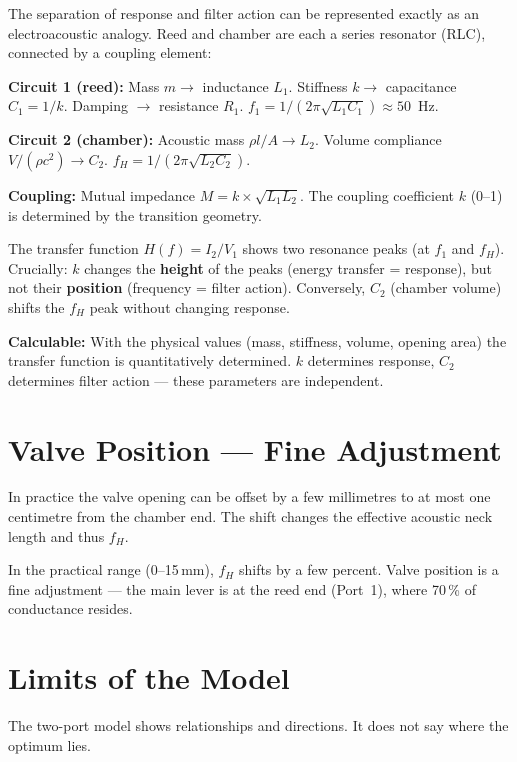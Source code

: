 \documentclass[11pt,a4paper]{article}
\begin{document}
The separation of response and filter action can be represented exactly as an electroacoustic analogy. Reed and chamber are each a series resonator (RLC), connected by a coupling element:

\textbf{Circuit 1 (reed):} Mass $m \to$ inductance $L_1$. Stiffness $k \to$ capacitance $C_1 = 1/k$. Damping $\to$ resistance $R_1$. $f_1 = 1/(2\pi\sqrt{L_1 C_1}) \approx 50$~Hz.

\textbf{Circuit 2 (chamber):} Acoustic mass $\rho l/A \to L_2$. Volume compliance $V/(\rho c^2) \to C_2$. $f_H = 1/(2\pi\sqrt{L_2 C_2})$.

\textbf{Coupling:} Mutual impedance $M = k \times \sqrt{L_1 L_2}$. The coupling coefficient $k$ (0--1) is determined by the transition geometry.

The transfer function $H(f) = I_2 / V_1$ shows two resonance peaks (at $f_1$ and $f_H$). Crucially: $k$ changes the \textbf{height} of the peaks (energy transfer = response), but not their \textbf{position} (frequency = filter action). Conversely, $C_2$ (chamber volume) shifts the $f_H$ peak without changing response.

\begin{tcolorbox}[colframe=keygreen, colback=green!5!white]
\textbf{Calculable:} With the physical values (mass, stiffness, volume, opening area) the transfer function is quantitatively determined. $k$ determines response, $C_2$ determines filter action --- these parameters are independent.
\end{tcolorbox}

\section{Valve Position --- Fine Adjustment}

In practice the valve opening can be offset by a few millimetres to at most one centimetre from the chamber end. The shift changes the effective acoustic neck length and thus $f_H$.

In the practical range (0--15\,mm), $f_H$ shifts by a few percent. Valve position is a fine adjustment --- the main lever is at the reed end (Port~1), where 70\,\% of conductance resides.

\section{Limits of the Model}

The two-port model shows relationships and directions. It does not say where the optimum lies.
\end{document}
